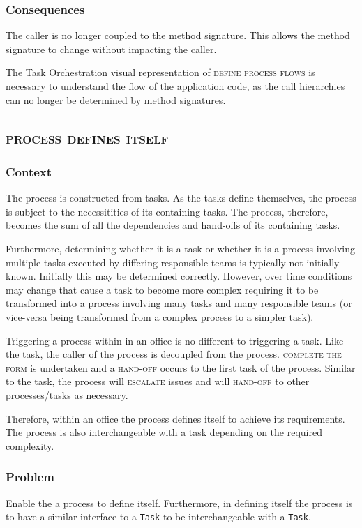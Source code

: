 \documentclass[prodmode]{style/acmlarge}
\begin{document}
\subsubsection*{Consequences} The caller is no longer coupled to the method
signature.  This allows the method signature to change without impacting the
caller.

The Task Orchestration visual representation of \textsc{define process flows} is
necessary to understand the flow of the application code, as the call
hierarchies can no longer be determined by method signatures.



\subsection{\textsc{\textbf{process defines itself}}}

\subsubsection*{Context} The process is constructed from tasks.  As the tasks
define themselves, the process is subject to the necessitities of its containing
tasks.  The process, therefore, becomes the sum of all the dependencies and
hand-offs of its containing tasks.

Furthermore, determining whether it is a task or whether it is a process involving
multiple tasks executed by differing responsible teams is typically not
initially known.  Initially this may be determined correctly.  However, over
time conditions may change that cause a task to become more complex requiring
it to be transformed into a process involving many tasks and many responsible
teams (or vice-versa being transformed from a complex process to a simpler task).

Triggering a process within in an office is no different to triggering a task.
Like the task, the caller of the process is decoupled from the process.
\textsc{complete the form} is undertaken and a \textsc{hand-off} occurs to the
first task of the process.  Similar to the task, the process will
\textsc{escalate} issues and will \textsc{hand-off} to other processes/tasks as
necessary.

Therefore, within an office the process defines itself to achieve its
requirements.  The process is also interchangeable with a task depending on the
required complexity.

\subsubsection*{Problem} Enable the a process to define itself.  Furthermore, in
defining itself the process is to have a similar interface to a \texttt{Task} to
be interchangeable with a \texttt{Task}.
\end{document}
